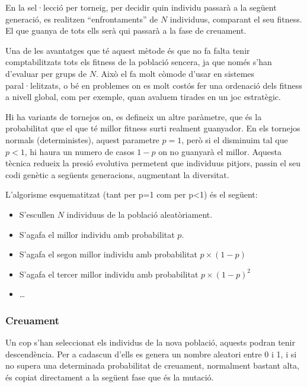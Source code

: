 En la sel·lecció per torneig, per decidir quin individu passarà a la següent
generació, es realitzen ``enfrontaments'' de $N$ individuus, comparant el seu
fitness.  El que guanya de tots ells serà qui passarà a la fase de creuament.

Una de les avantatges que té aquest mètode és que no fa falta tenir
comptabilitzats tots els fitness de la població sencera, ja que només s'han
d'evaluar per grups de $N$.  Això el fa molt còmode d'usar en sistemes
paral·lelitzats, o bé en problemes on es molt costós fer una ordenació dels
fitness a nivell global, com per exemple, quan avaluem tirades en un joc
estratègic.

Hi ha variants de tornejos on, es defineix un altre paràmetre, que és la
probabilitat que el que té millor fitness surti realment guanyador.  En els
tornejos normals (deterministes), aquest parametre $p=1$, però si el disminuim
tal que $p<1$, hi haura un numero de casos $1-p$ on no guanyarà el millor.
Aquesta tècnica redueix la presió evolutiva permetent que individuus pitjors,
passin el seu codi genètic a següents generacions, augmentant la diversitat.

L'algorisme esquematitzat (tant per p=1 com per p<1) és el següent:

\begin{itemize}
	\item S'escullen $N$ individuus de la població aleatòriament.
	\item S'agafa el millor individu amb probabilitat $p$.
	\item S'agafa el segon millor individu amb probabilitat $p \times (1-p)$
	\item S'agafa el tercer millor individu amb probabilitat $p \times (1-p)^2$
	\item \ldots
\end{itemize}



\subsubsection{Creuament}

Un cop s'han seleccionat els individus de la nova població, aquests podran tenir
descendència. Per a cadascun d'ells es genera un nombre aleatori entre 0 i 1, i
si no supera una determinada probabilitat de creuament, normalment bastant alta,
és copiat directament a la següent fase que és la mutació.

